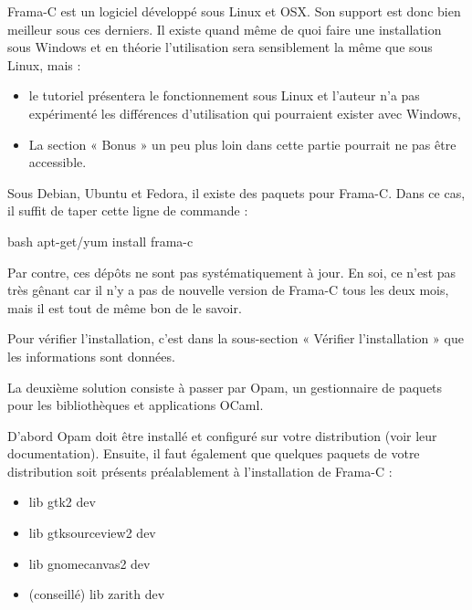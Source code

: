 Frama-C est un logiciel développé sous Linux et OSX. Son support est donc bien
meilleur sous ces derniers. Il existe quand même de quoi faire une installation 
sous Windows et en théorie l'utilisation sera sensiblement la même que sous 
Linux, mais :



\begin{Warning}
\begin{itemize}
\item le tutoriel présentera le fonctionnement sous Linux et l'auteur n'a pas 
expérimenté les différences d'utilisation qui pourraient exister avec 
Windows,
\item La section « Bonus » un peu plus loin dans cette partie pourrait ne pas être
accessible.
\end{itemize}
\end{Warning}






Sous Debian, Ubuntu et Fedora, il existe des paquets pour Frama-C. Dans ce cas, 
il suffit de taper cette ligne de commande :



\begin{CodeBlock}{bash}
apt-get/yum install frama-c
\end{CodeBlock}



Par contre, ces dépôts ne sont pas systématiquement à jour. En soi, ce n'est pas très gênant car il n'y a pas de nouvelle version de Frama-C tous les deux mois, mais il est tout de même bon de le savoir.



Pour vérifier l'installation, c'est dans la sous-section « Vérifier l'installation »
que les informations sont données.





La deuxième solution consiste à passer par Opam, un gestionnaire de paquets 
pour les bibliothèques et applications OCaml.



D'abord Opam doit être installé et configuré sur votre distribution (voir 
leur documentation). Ensuite, il faut également que quelques paquets de votre
distribution soit présents préalablement à l'installation de Frama-C :



\begin{itemize}
\item lib gtk2 dev
\item lib gtksourceview2 dev
\item lib gnomecanvas2 dev
\item (conseillé) lib zarith dev
\end{itemize}


